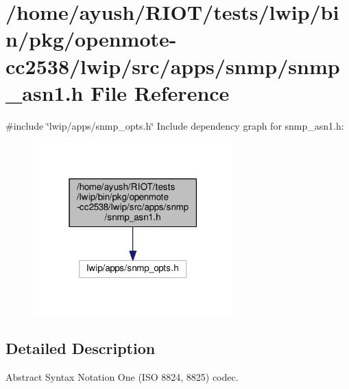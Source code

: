 \hypertarget{openmote-cc2538_2lwip_2src_2apps_2snmp_2snmp__asn1_8h}{}\section{/home/ayush/\+R\+I\+O\+T/tests/lwip/bin/pkg/openmote-\/cc2538/lwip/src/apps/snmp/snmp\+\_\+asn1.h File Reference}
\label{openmote-cc2538_2lwip_2src_2apps_2snmp_2snmp__asn1_8h}
{\ttfamily \#include \char`\"{}lwip/apps/snmp\+\_\+opts.\+h\char`\"{}}\newline
Include dependency graph for snmp\+\_\+asn1.\+h\+:
\nopagebreak
\begin{figure}[H]
\begin{center}
\leavevmode
\includegraphics[width=219pt]{openmote-cc2538_2lwip_2src_2apps_2snmp_2snmp__asn1_8h__incl}
\end{center}
\end{figure}


\subsection{Detailed Description}
Abstract Syntax Notation One (I\+SO 8824, 8825) codec. 